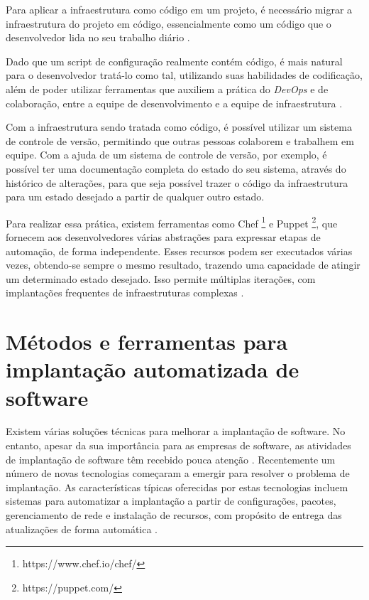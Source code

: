 Para aplicar a infraestrutura como código em um projeto, é necessário
migrar a infraestrutura do projeto em código, essencialmente como um
código que o desenvolvedor lida no seu trabalho diário \cite{byhand}.

Dado que um script de configuração realmente contém código, é mais natural
para o desenvolvedor tratá-lo como tal, utilizando suas habilidades de codificação,
além de poder utilizar ferramentas que auxiliem a prática do \textit{DevOps} e de colaboração,
entre a equipe de desenvolvimento e a equipe de infraestrutura \cite{byhand}. 

Com a infraestrutura sendo tratada como código, é possível utilizar um
sistema de controle de versão, permitindo que outras pessoas colaborem e trabalhem em
equipe. Com a ajuda de um sistema de controle de versão, por exemplo, é possível 
ter uma documentação completa do estado do seu sistema, 
através do histórico de alterações, para que seja possível
trazer o código da infraestrutura para um estado desejado a partir de
qualquer outro estado.

Para realizar essa prática, existem ferramentas como Chef \footnote{https://www.chef.io/chef/} e 
Puppet \footnote{https://puppet.com/}, que
fornecem aos desenvolvedores várias abstrações para 
expressar etapas de automação,
de forma independente. Esses recursos podem ser executados várias vezes,
obtendo-se sempre o mesmo resultado, trazendo uma capacidade de atingir um determinado
estado desejado. Isso permite múltiplas iterações, 
com implantações frequentes de infraestruturas complexas
\cite{Hummer2013}.

\section{Métodos e ferramentas para implantação automatizada de software}
\label{subsec:metodoseferramentas}

Existem várias soluções técnicas para melhorar a implantação de software. No 
entanto, apesar da sua importância para as empresas de software, as atividades
de implantação de software têm recebido pouca atenção \cite{5741269}. Recentemente 
um número de novas tecnologias começaram a emergir para
resolver o problema de implantação. As características típicas oferecidas por
estas tecnologias incluem sistemas para automatizar a implantação a partir de
configurações, pacotes, gerenciamento de rede e instalação de recursos, com
propósito de entrega das atualizações de forma automática \cite{deployment1998}.

